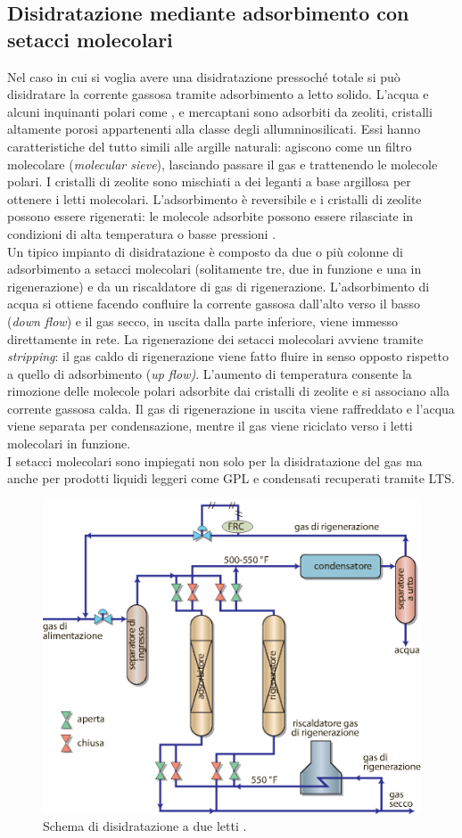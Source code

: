 \subsection{Disidratazione mediante adsorbimento con setacci molecolari}
Nel caso in cui si voglia avere una disidratazione pressoché totale si può disidratare la corrente gassosa tramite adsorbimento a letto solido. L'acqua e alcuni inquinanti polari come ,  e mercaptani sono adsorbiti da zeoliti, cristalli altamente porosi appartenenti alla classe degli allumninosilicati. Essi hanno caratteristiche del tutto simili alle argille naturali: agiscono come un filtro molecolare (\textit{molecular sieve}), lasciando passare il gas e trattenendo le molecole polari. I cristalli di zeolite sono mischiati a dei leganti a base argillosa per ottenere i letti molecolari. L'adsorbimento è reversibile e i cristalli di zeolite possono essere rigenerati: le molecole adsorbite possono essere rilasciate in condizioni di alta temperatura o basse pressioni \parencite{grace2010techinf}. \\
Un tipico impianto di disidratazione è composto da due o più colonne di adsorbimento a setacci molecolari (solitamente tre, due in funzione e una in rigenerazione) e da un riscaldatore di gas di rigenerazione. L'adsorbimento di acqua si ottiene facendo confluire la corrente gassosa dall'alto verso il basso (\textit{down flow}) e il gas secco, in uscita dalla parte inferiore, viene immesso direttamente in rete. La rigenerazione dei setacci molecolari avviene tramite \textit{stripping}: il gas caldo di rigenerazione viene fatto fluire in senso opposto rispetto a quello di adsorbimento (\textit{up flow)}. L'aumento di temperatura consente la rimozione delle molecole polari adsorbite dai cristalli di zeolite e si associano alla corrente gassosa calda. Il gas di rigenerazione in uscita viene raffreddato e l'acqua viene separata per condensazione, mentre il gas viene riciclato verso i letti molecolari in funzione.\\
I setacci molecolari sono impiegati non solo per la disidratazione del gas ma anche per prodotti liquidi leggeri come GPL e condensati recuperati tramite LTS.

\begin{figure}[htbp]
    \centering
    \includegraphics[width=.7\textwidth]{fig/impianti/molecularsieve.eps}
    \caption{Schema di disidratazione a due letti \parencite{bianco2005impiantigas}.}
    \label{fig:molecularsieve}
\end{figure}

